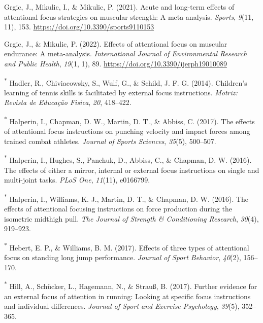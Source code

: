 \documentclass[
  man, donotrepeattitle,floatsintext]{apa7}
\newlength{\cslhangindent}
\newlength{\cslentryspacingunit} %
\newenvironment{CSLReferences}[2] %
 {%
  \setlength{\parindent}{0pt}
  \ifodd #1
  \let\oldpar\par
  \def\par{\hangindent=\cslhangindent\oldpar}
  \fi
  \setlength{\parskip}{#2\cslentryspacingunit}
 }%
 {}
\begin{document}
\begin{CSLReferences}{1}{0}
\leavevmode{}%
Grgic, J., Mikulic, I., \& Mikulic, P. (2021). Acute and long-term effects of attentional focus strategies on muscular strength: {A} meta-analysis. \emph{Sports}, \emph{9}(11, 11), 153. \url{https://doi.org/10.3390/sports9110153}

\leavevmode{}%
Grgic, J., \& Mikulic, P. (2022). Effects of attentional focus on muscular endurance: {A} meta-analysis. \emph{International Journal of Environmental Research and Public Health}, \emph{19}(1, 1), 89. \url{https://doi.org/10.3390/ijerph19010089}

\leavevmode{}%
\textsuperscript{*} Hadler, R., Chiviacowsky, S., Wulf, G., \& Schild, J. F. G. (2014). Children's learning of tennis skills is facilitated by external focus instructions. \emph{Motriz: Revista de Educa{ç}{ã}o F{ı́}sica}, \emph{20}, 418--422.

\leavevmode{}%
\textsuperscript{*} Halperin, I., Chapman, D. W., Martin, D. T., \& Abbiss, C. (2017). The effects of attentional focus instructions on punching velocity and impact forces among trained combat athletes. \emph{Journal of Sports Sciences}, \emph{35}(5), 500--507.

\leavevmode{}%
\textsuperscript{*} Halperin, I., Hughes, S., Panchuk, D., Abbiss, C., \& Chapman, D. W. (2016). The effects of either a mirror, internal or external focus instructions on single and multi-joint tasks. \emph{PLoS One}, \emph{11}(11), e0166799.

\leavevmode{}%
\textsuperscript{*} Halperin, I., Williams, K. J., Martin, D. T., \& Chapman, D. W. (2016). The effects of attentional focusing instructions on force production during the isometric midthigh pull. \emph{The Journal of Strength \& Conditioning Research}, \emph{30}(4), 919--923.

\leavevmode{}%
\textsuperscript{*} Hebert, E. P., \& Williams, B. M. (2017). Effects of three types of attentional focus on standing long jump performance. \emph{Journal of Sport Behavior}, \emph{40}(2), 156--170.

\leavevmode{}%
\textsuperscript{*} Hill, A., Schücker, L., Hagemann, N., \& Strauß, B. (2017). Further evidence for an external focus of attention in running: Looking at specific focus instructions and individual differences. \emph{Journal of Sport and Exercise Psychology}, \emph{39}(5), 352--365.


\end{CSLReferences}
\end{document}
